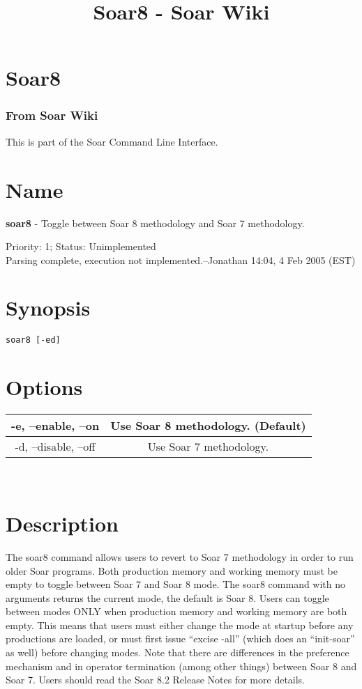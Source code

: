 \documentclass[10pt]{article}
\title{Soar8 - Soar Wiki}
\begin{document}
\section*{Soar8}
\subsubsection*{From Soar Wiki}


 This is part of the Soar Command Line Interface. 
\section*{ Name }


 \textbf{soar8}
 - Toggle between Soar 8 methodology and Soar 7 methodology. 


 Priority: 1; Status: Unimplemented\\ 
Parsing complete, execution not implemented.--Jonathan 14:04, 4 Feb 2005 (EST) 
\section*{ Synopsis }
\begin{verbatim}
soar8 [-ed]

\end{verbatim}
\section*{ Options }


\begin{tabular}{|c|c|}
\hline 
 -e, --enable, --on  & Use Soar 8 methodology. (Default)  \\
 \hline 
 -d, --disable, --off  & Use Soar 7 methodology.  \\
 \hline 

\end{tabular}



 \\ 

\section*{ Description }


 The soar8 command allows users to revert to Soar 7 methodology in order to run older Soar programs. Both production memory and working memory must be empty to toggle between Soar 7 and Soar 8 mode. The soar8 command with no arguments returns the current mode, the default is Soar 8. Users can toggle between modes ONLY when production memory and working memory are both empty. This means that users must either change the mode at startup before any productions are loaded, or must first issue ``excise -all'' (which does an ``init-soar'' as well) before changing modes. Note that there are differences in the preference mechanism and in operator termination (among other things) between Soar 8 and Soar 7. Users should read the Soar 8.2 Release Notes for more details. 
\end{document}
